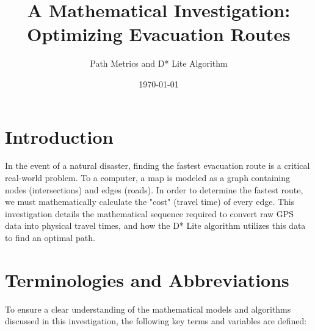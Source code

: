 \documentclass[12pt, a4paper]{article}
\title{A Mathematical Investigation: Optimizing Evacuation Routes}
\author{Path Metrics and D* Lite Algorithm}
\date{\today}
\begin{document}
\maketitle
\tableofcontents
\newpage

\section{Introduction}
In the event of a natural disaster, finding the fastest evacuation route is a critical real-world problem. To a computer, a map is modeled as a graph containing nodes (intersections) and edges (roads). In order to determine the fastest route, we must mathematically calculate the "cost" (travel time) of every edge. This investigation details the mathematical sequence required to convert raw GPS data into physical travel times, and how the D* Lite algorithm utilizes this data to find an optimal path.

\section{Terminologies and Abbreviations}
To ensure a clear understanding of the mathematical models and algorithms discussed in this investigation, the following key terms and variables are defined:
\end{document}
